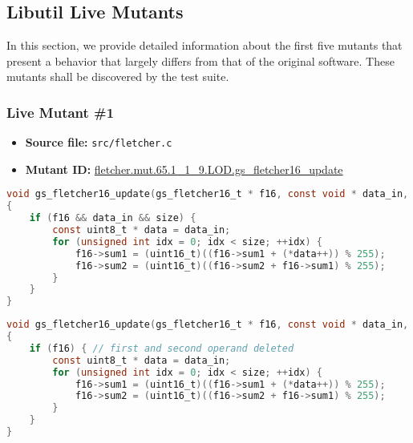 \subsection{Libutil Live Mutants}

In this section, we provide detailed information about the first five mutants that present a behavior that largely differs from that of the original software. These mutants shall be discovered by the test suite.

\subsubsection{Live Mutant \#1}

\begin{itemize}
\item \textbf{Source file:} \texttt{src/fletcher.c}
\item \textbf{Mutant ID:} \url{fletcher.mut.65.1_1_9.LOD.gs_fletcher16_update}
\end{itemize}

\begin{lstlisting}[language=C, label=live_1, caption=Original source code.]
void gs_fletcher16_update(gs_fletcher16_t * f16, const void * data_in, size_t size)
{
    if (f16 && data_in && size) {
        const uint8_t * data = data_in;
        for (unsigned int idx = 0; idx < size; ++idx) {
            f16->sum1 = (uint16_t)((f16->sum1 + (*data++)) % 255);
            f16->sum2 = (uint16_t)((f16->sum2 + f16->sum1) % 255);
        }
    }
}
\end{lstlisting}

\begin{lstlisting}[language=C, label=live_1, caption=Mutant source code.]
void gs_fletcher16_update(gs_fletcher16_t * f16, const void * data_in, size_t size)
{
    if (f16) { // first and second operand deleted
        const uint8_t * data = data_in;
        for (unsigned int idx = 0; idx < size; ++idx) {
            f16->sum1 = (uint16_t)((f16->sum1 + (*data++)) % 255);
            f16->sum2 = (uint16_t)((f16->sum2 + f16->sum1) % 255);
        }
    }
}
\end{lstlisting}




